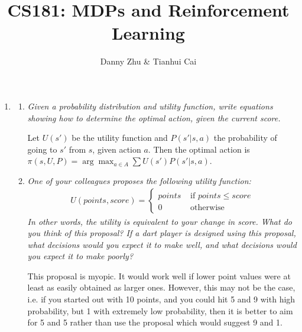 \documentclass{article}
\title{CS181: MDPs and Reinforcement Learning}
\author{Danny Zhu \& Tianhui Cai}
\begin{document}
\maketitle
\begin{enumerate}
\item 
  \begin{enumerate}
  \item \emph{Given a probability distribution and utility function,
    write equations showing how to determine the optimal action, given
    the current score.}

    Let $U(s')$ be the utility function and $P(s'|s,a)$ the
    probability of going to $s'$ from $s$, given action $a$. Then the
    optimal action is $\pi(s,U,P)=\arg\max_{a\in A} \sum
    U(s')P(s'|s,a)$.


  \item \emph{One of your colleagues proposes the following utility
    function:}
    \begin{align*}
      U(points,score)=
      \begin{cases}
        points & \text{ if } points \leq score\\
        0 & \text{ otherwise}
      \end{cases}
    \end{align*}
    \emph{In other words, the utility is equivalent to your change in
      score. What do you think of this proposal? If a dart player is
      designed using this proposal, what decisions would you expect it
      to make well, and what decisions would you expect it to make
      poorly?}

    This proposal is myopic. It would work well if lower point values
    were at least as easily obtained as larger ones. However, this may
    not be the case, i.e. if you started out with 10 points, and you
    could hit 5 and 9 with high probability, but 1 with extremely low
    probability, then it is better to aim for 5 and 5 rather than use
    the proposal which would suggest 9 and 1.
  \end{enumerate}


\end{enumerate}
\end{document}
